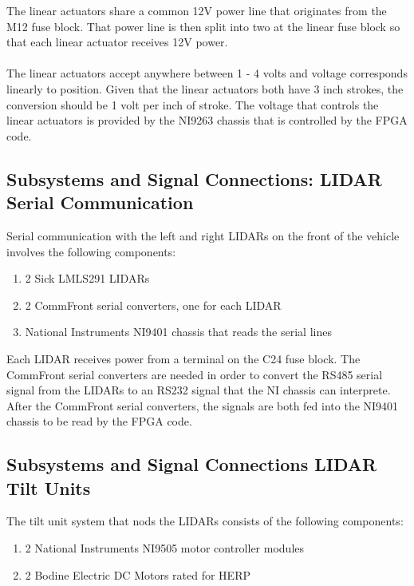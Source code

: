 The linear actuators share a common 12V power line that originates from the M12 fuse block. That power line is then split into two at the linear fuse block so that each linear actuator receives 12V power. \\ \\
%
\noindent The linear actuators accept anywhere between 1 - 4 volts and voltage corresponds linearly to position. Given that the linear actuators both have 3 inch strokes, the conversion should be 1 volt per inch of stroke. The voltage that controls the linear actuators is provided by the NI9263 chassis that is controlled by the FPGA code. 

\subsection{Subsystems and Signal Connections: LIDAR Serial Communication}

Serial communication with the left and right LIDARs on the front of the vehicle involves the following components:

\begin{enumerate}
\item 2 Sick LMLS291 LIDARs
\item 2 CommFront serial converters, one for each LIDAR
\item National Instruments NI9401 chassis that reads the serial lines
\end{enumerate}

Each LIDAR receives power from a terminal on the C24 fuse block. The CommFront serial converters are needed in order to convert the RS485 serial signal from the LIDARs to an RS232 signal that the NI chassis can interprete. After the CommFront serial converters, the signals are both fed into the NI9401 chassis to be read by the FPGA code.

\subsection {Subsystems and Signal Connections LIDAR Tilt Units}

The tilt unit system that nods the LIDARs consists of the following components:

\begin{enumerate}
\item 2 National Instruments NI9505 motor controller modules
\item 2 Bodine Electric DC Motors rated for HERP
\end{enumerate}

